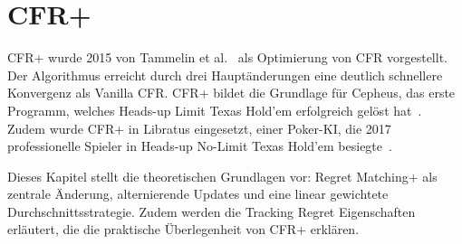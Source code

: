 \section{CFR+}

CFR+ wurde 2015 von Tammelin et al.~\cite{tammelin2015solving} als Optimierung von CFR vorgestellt.
Der Algorithmus erreicht durch drei Hauptänderungen eine deutlich schnellere Konvergenz als Vanilla CFR.
CFR+ bildet die Grundlage für Cepheus, das erste Programm, welches Heads-up Limit Texas Hold'em erfolgreich gelöst hat~\cite{bowling2015heads}.
Zudem wurde CFR+ in Libratus eingesetzt, einer Poker-KI, die 2017 professionelle Spieler in Heads-up No-Limit Texas Hold'em besiegte~\cite{brown2017superhuman}.

Dieses Kapitel stellt die theoretischen Grundlagen vor: Regret Matching+ als zentrale Änderung, alternierende Updates und eine linear gewichtete Durchschnittsstrategie.
Zudem werden die Tracking Regret Eigenschaften erläutert, die die praktische Überlegenheit von CFR+ erklären.






